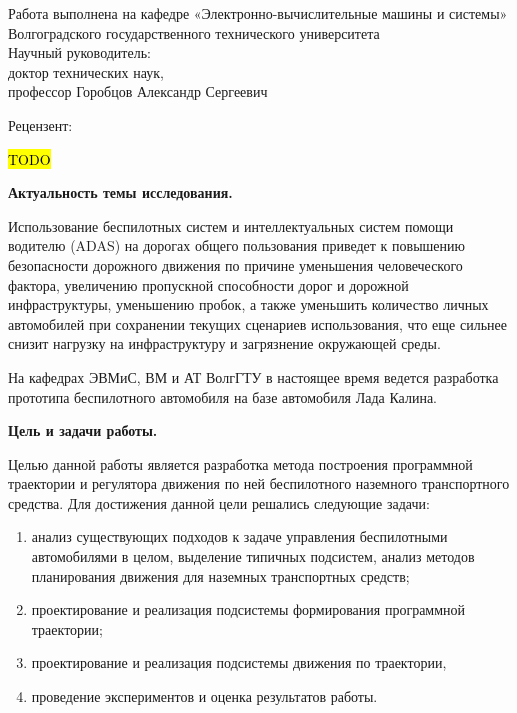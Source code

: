 \begin{nospasing}
\noindent
Работа выполнена на кафедре «Электронно-вычислительные машины и
системы» Волгоградского государственного технического университета\\

\noindent
Научный руководитель:\\

    \setlength{\leftskip}{3cm}
    \noindent
    доктор технических наук, \\
    профессор Горобцов Александр Сергеевич \\

    \setlength{\leftskip}{0pt}

\noindent
Рецензент:

    \setlength{\leftskip}{3cm}
    \noindent
    \hl{TODO} \\

    \setlength{\leftskip}{0pt}

\end{nospasing}

\newpage


\textbf{Актуальность темы исследования.}

Использование беспилотных систем и интеллектуальных систем помощи водителю (ADAS) на дорогах общего
пользования приведет к повышению безопасности дорожного движения по причине уменьшения человеческого
фактора, увеличению пропускной способности дорог и дорожной инфраструктуры, уменьшению пробок, а также
уменьшить количество личных автомобилей при сохранении текущих сценариев использования, что еще
сильнее снизит нагрузку на инфраструктуру и загрязнение окружающей среды.

На кафедрах ЭВМиС, ВМ и АТ ВолгГТУ в настоящее время ведется разработка прототипа беспилотного
автомобиля на базе автомобиля Лада Калина.

\textbf{Цель и задачи работы.}

Целью данной работы является разработка метода построения программной траектории и регулятора движения по ней
беспилотного наземного транспортного средства.
Для достижения данной цели решались следующие задачи:
\begin{enumerate}
    \item анализ существующих подходов к задаче управления беспилотными автомобилями в целом, выделение
          типичных подсистем, анализ методов планирования движения для наземных транспортных средств;
    \item проектирование и реализация подсистемы формирования программной траектории;
    \item проектирование и реализация подсистемы движения по траектории,
    \item проведение экспериментов и оценка результатов работы.
\end{enumerate}

